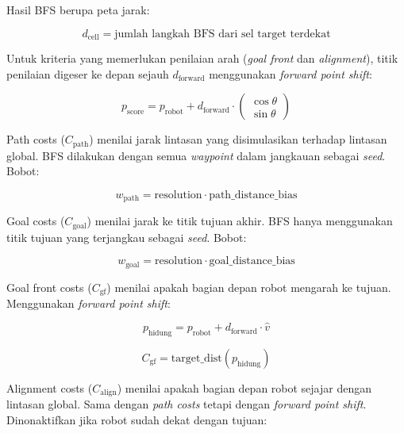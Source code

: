 Hasil BFS berupa peta jarak:

\begin{equation}
d_{\text{cell}} = \text{jumlah langkah BFS dari sel target terdekat}
\end{equation}

Untuk kriteria yang memerlukan penilaian arah (\emph{goal front} dan
\emph{alignment}), titik penilaian digeser ke depan sejauh
$d_{\text{forward}}$ menggunakan \emph{forward point shift}:

\begin{equation}
p_{\text{score}} = p_{\text{robot}} + d_{\text{forward}} \cdot
\begin{pmatrix} \cos\theta \\ \sin\theta \end{pmatrix}
\end{equation}

Path costs ($C_{\text{path}}$) menilai jarak lintasan yang
disimulasikan terhadap lintasan global. BFS dilakukan dengan semua
\emph{waypoint} dalam jangkauan sebagai \emph{seed}. Bobot:

\begin{equation}
w_{\text{path}} = \text{resolution} \cdot
\text{path\_distance\_bias}
\end{equation}

Goal costs ($C_{\text{goal}}$) menilai jarak ke titik
tujuan akhir. BFS hanya menggunakan titik tujuan yang terjangkau
sebagai \emph{seed}. Bobot:

\begin{equation}
w_{\text{goal}} = \text{resolution} \cdot
\text{goal\_distance\_bias}
\end{equation}

Goal front costs ($C_{\text{gf}}$) menilai apakah bagian
depan robot mengarah ke tujuan. Menggunakan \emph{forward point
shift}:

\begin{equation}
p_{\text{hidung}} = p_{\text{robot}} + d_{\text{forward}} \cdot
\hat{v}
\end{equation}

\begin{equation}
C_{\text{gf}} = \text{target\_dist}(p_{\text{hidung}})
\end{equation}

Alignment costs ($C_{\text{align}}$) menilai apakah bagian
depan robot sejajar dengan lintasan global. Sama dengan \emph{path
costs} tetapi dengan \emph{forward point shift}. Dinonaktifkan jika
robot sudah dekat dengan tujuan:

